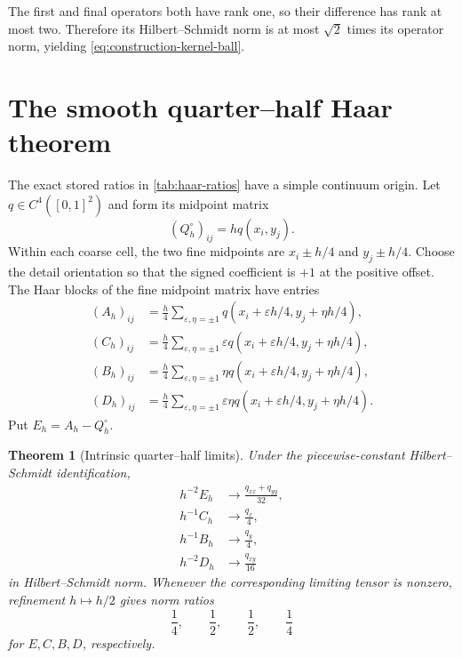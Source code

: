 \documentclass[11pt]{article}
\newtheorem{theorem}{Theorem}[section]
\theoremstyle{definition}
\theoremstyle{remark}
\begin{document}
The first and final operators both have rank one, so their difference has
rank at most two.  Therefore its Hilbert--Schmidt norm is at most $\sqrt2$
times its operator norm, yielding \eqref{eq:construction-kernel-ball}.

\section{The smooth quarter--half Haar theorem}
\label{sec:haar-theorem}

The exact stored ratios in \cref{tab:haar-ratios} have a simple continuum
origin.  Let $q\in C^4([0,1]^2)$ and form its midpoint matrix
\[
 (Q_h^\circ)_{ij}=h q(x_i,y_j).
\]
Within each coarse cell, the two fine midpoints are
$x_i\pm h/4$ and $y_j\pm h/4$.  Choose the detail orientation so that the
signed coefficient is $+1$ at the positive offset.  The Haar blocks of the
fine midpoint matrix have entries
\begin{align}
 (A_h)_{ij}
 &=\frac h4\sum_{\varepsilon,\eta=\pm1}
   q(x_i+\varepsilon h/4,y_j+\eta h/4),\\
 (C_h)_{ij}
 &=\frac h4\sum_{\varepsilon,\eta=\pm1}
   \varepsilon q(x_i+\varepsilon h/4,y_j+\eta h/4),\\
 (B_h)_{ij}
 &=\frac h4\sum_{\varepsilon,\eta=\pm1}
   \eta q(x_i+\varepsilon h/4,y_j+\eta h/4),\\
 (D_h)_{ij}
 &=\frac h4\sum_{\varepsilon,\eta=\pm1}
   \varepsilon\eta q(x_i+\varepsilon h/4,y_j+\eta h/4).
 \label{eq:four-point-haar}
\end{align}
Put $E_h=A_h-Q_h^\circ$.

\begin{theorem}[Intrinsic quarter--half limits]
\label{thm:haar-limits}
Under the piecewise-constant Hilbert--Schmidt identification,
\begin{align}
 h^{-2}E_h&\longrightarrow\frac{q_{xx}+q_{yy}}{32},
 \label{eq:E-limit}\\
 h^{-1}C_h&\longrightarrow\frac{q_x}{4},
 \label{eq:C-limit}\\
 h^{-1}B_h&\longrightarrow\frac{q_y}{4},
 \label{eq:B-limit}\\
 h^{-2}D_h&\longrightarrow\frac{q_{xy}}{16}
 \label{eq:D-limit}
\end{align}
in Hilbert--Schmidt norm.  Whenever the corresponding limiting tensor is
nonzero, refinement $h\mapsto h/2$ gives norm ratios
\[
 \frac14,\qquad\frac12,\qquad\frac12,\qquad\frac14
\]
for $E,C,B,D$, respectively.
\end{theorem}
\end{document}
